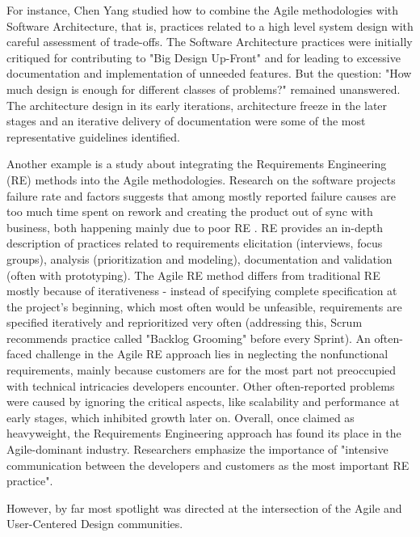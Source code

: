 \documentclass{article}
\begin{document}
For instance, Chen Yang \citep{yang2016systematic} studied how to combine the Agile methodologies with Software Architecture, that is, practices related to a high level system design with careful assessment of trade-offs. The Software Architecture practices were initially critiqued for contributing to "Big Design Up-Front" and for leading to excessive documentation and implementation of unneeded features. But the question: "How much design is enough for different classes of problems?" remained unanswered. The architecture design in its early iterations, architecture freeze in the later stages and an iterative delivery of documentation were some of the most representative guidelines identified.

Another example is a study about integrating the Requirements Engineering (RE) methods into the Agile methodologies. Research on the software projects failure rate and factors suggests that among mostly reported failure causes are too much time spent on rework and creating the product out of sync with business, both happening mainly due to poor RE \citep{arcidiacono2017comparative}. RE provides an in-depth description of practices related to requirements elicitation (interviews, focus groups), analysis (prioritization and modeling), documentation and validation (often with prototyping). The Agile RE method differs from traditional RE mostly because of iterativeness - instead of specifying complete specification at the project's beginning, which most often would be unfeasible, requirements are specified iteratively and reprioritized very often (addressing this, Scrum recommends practice called "Backlog Grooming" before every Sprint\citep{rubin2012essential}). An often-faced challenge in the Agile RE approach lies in neglecting the nonfunctional requirements, mainly because customers are for the most part not preoccupied with technical intricacies developers encounter. Other often-reported problems were caused by ignoring the critical aspects,  like scalability and performance at early stages, which inhibited growth later on. Overall, once claimed as heavyweight, the Requirements Engineering approach has found its place in the Agile-dominant industry. Researchers emphasize the importance of "intensive communication between the developers and customers as the most important RE practice". \citep{paetsch2003requirements} \citep{cao2008Agile} 

However, by far most spotlight was directed at the intersection of the Agile and User-Centered Design communities.
\end{document}
